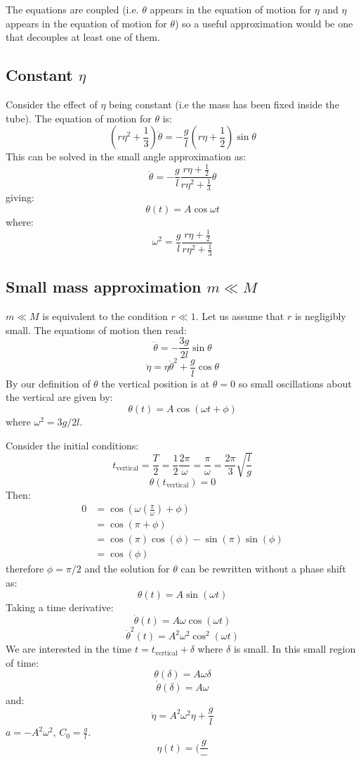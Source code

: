 \documentclass[9pt]{report}
\begin{document}
\begin{enumerate}
The equations are coupled (i.e. $\theta$ appears in the equation of motion for
$\eta$ and $\eta$ appears in the equation of motion for $\theta$) so a useful
approximation would be one that decouples at least one of them.

\subsection{Constant $\eta$}
Consider the effect of $\eta$ being constant (i.e
the mass has been fixed inside the tube). The equation of motion for $\theta$ is:
\[
  (r \eta^2 + \frac{1}{3}) \ddot{\theta} = -\frac{g}{l} (r \eta + \frac{1}{2}) \sin\theta
\]
This can be solved in the small angle approximation as:
\[
  \ddot{\theta} = - \frac{g}{l} \frac{r\eta + \frac{1}{2}}{r\eta^2 + \frac{1}{3}}\theta
\]
giving:
\[
  \theta(t) = A \cos \omega t
\]
where:
\[
  \omega^2 = \frac{g}{l} \frac{r\eta + \frac{1}{2}}{r\eta^2 + \frac{1}{3}}
\]

\subsection{Small mass approximation $m \ll M$}
$m \ll M$ is equivalent to the condition $r \ll 1$. Let us assume that $r$ is
negligibly small. The equations of motion then read:
\begin{equation}
\ddot{\theta} = -\frac{3g}{2l} \sin \theta \label{small_r_el_theta}
\end{equation}
\begin{equation}
\ddot{\eta} = \eta \dot{\theta}^2 \label{small_r_el_eta} + \frac{g}{l} \cos \theta
\end{equation}
By our definition of $\theta$ the vertical position is at $\theta = 0$ so small
oscillations about the vertical are given by:
\[
\theta(t) = A \cos (\omega t + \phi)
\]
where $\omega^2 = 3 g / 2 l$.

Consider the initial conditions:
\[
  t_\text{vertical} = \frac{T}{2} = \frac{1}{2} \frac{2\pi}{\omega} = \frac{\pi}{\omega} = \frac{2\pi}{3}\sqrt{\frac{l}{g}}
\]
\[
 \theta(t_\text{vertical}) = 0
\]
Then:
\[
\begin{align}
0 &= \cos(\omega (\frac{\pi}{\omega}) + \phi) \\
  &= \cos(\pi + \phi)\\
  &= \cos(\pi)\cos(\phi)-\sin(\pi)\sin(\phi)\\
  &= \cos(\phi)
\end{align}
\]
therefore $\phi = \pi/2$ and the solution for $\theta$ can be rewritten without
a phase shift as:
\[
  \theta(t) = A \sin(\omega t)
\]
Taking a time derivative:
\[
\dot{\theta}(t) = A\omega \cos (\omega t)
\]
\[
\dot{\theta}^2(t) = A^2\omega^2 \cos^2 (\omega t)
\]
We are interested in the time $t = t_\text{vertical} + \delta$ where $\delta$ is
small. In this small region of time:
\[
  \theta (\delta) = A\omega \delta
\]
\[
  \dot{\theta} (\delta) = A \omega
\]
and:
\[
  \ddot{\eta} = A^2 \omega^2 \eta + \frac{g}{l}
\]
$a = -A^2 \omega^2$, $C_0 = \frac{g}{l}$.
\[
  \eta(t) = ( \frac{g}{-}
\]


\end{enumerate}
\end{document}
